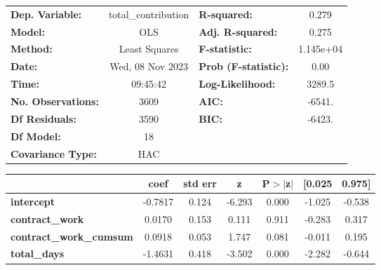 \begin{center}
\begin{tabular}{lclc}
\toprule
\textbf{Dep. Variable:}                     & total\_contribution & \textbf{  R-squared:         } &     0.279   \\
\textbf{Model:}                             &         OLS         & \textbf{  Adj. R-squared:    } &     0.275   \\
\textbf{Method:}                            &    Least Squares    & \textbf{  F-statistic:       } & 1.145e+04   \\
\textbf{Date:}                              &   Wed, 08 Nov 2023  & \textbf{  Prob (F-statistic):} &     0.00    \\
\textbf{Time:}                              &       09:45:42      & \textbf{  Log-Likelihood:    } &    3289.5   \\
\textbf{No. Observations:}                  &          3609       & \textbf{  AIC:               } &    -6541.   \\
\textbf{Df Residuals:}                      &          3590       & \textbf{  BIC:               } &    -6423.   \\
\textbf{Df Model:}                          &            18       & \textbf{                     } &             \\
\textbf{Covariance Type:}                   &         HAC         & \textbf{                     } &             \\
\bottomrule
\end{tabular}
\begin{tabular}{lcccccc}
                                            & \textbf{coef} & \textbf{std err} & \textbf{z} & \textbf{P$> |$z$|$} & \textbf{[0.025} & \textbf{0.975]}  \\
\midrule
\textbf{intercept}                          &      -0.7817  &        0.124     &    -6.293  &         0.000        &       -1.025    &       -0.538     \\
\textbf{contract\_work}                     &       0.0170  &        0.153     &     0.111  &         0.911        &       -0.283    &        0.317     \\
\textbf{contract\_work\_cumsum}             &       0.0918  &        0.053     &     1.747  &         0.081        &       -0.011    &        0.195     \\
\textbf{total\_days}                        &      -1.4631  &        0.418     &    -3.502  &         0.000        &       -2.282    &       -0.644     \\

\end{tabular}
\end{center}
